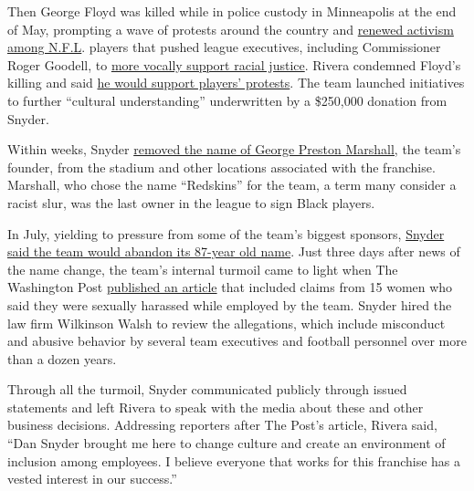 Then George Floyd was killed while in police custody in Minneapolis at
the end of May, prompting a wave of protests around the country and
\href{https://www.nytimes3xbfgragh.onion/2020/06/12/sports/football/nfl-protest-colin-kaepernick-activism.html}{renewed
activism among N.F.L}. players that pushed league executives, including
Commissioner Roger Goodell, to
\href{https://www.nytimes3xbfgragh.onion/2020/06/05/sports/football/trump-anthem-kneeling-kaepernick.html}{more
vocally support racial justice}. Rivera condemned Floyd's killing and
said
\href{https://www.washingtonfootball.com/video/head-coach-ron-rivera-i-m-proud-of-everyone-who-is-on-the-right-side-of-the-figh}{he
would support players' protests}. The team launched initiatives to
further ``cultural understanding'' underwritten by a \$250,000 donation
from Snyder.

Within weeks, Snyder
\href{https://www.nytimes3xbfgragh.onion/2020/06/24/sports/football/redskins-ring-of-fame-marshall.html}{removed
the name of George Preston Marshall,} the team's founder, from the
stadium and other locations associated with the franchise. Marshall, who
chose the name ``Redskins'' for the team, a term many consider a racist
slur, was the last owner in the league to sign Black players.

In July, yielding to pressure from some of the team's biggest sponsors,
\href{https://www.nytimes3xbfgragh.onion/2020/07/13/sports/football/washington-redskins-new-name.html}{Snyder
said the team would abandon its 87-year old name}. Just three days after
news of the name change, the team's internal turmoil came to light when
The Washington Post
\href{https://www.washingtonpost.com/sports/2020/07/16/redskins-sexual-harassment-larry-michael-alex-santos/?arc404=true}{published
an article} that included claims from 15 women who said they were
sexually harassed while employed by the team. Snyder hired the law firm
Wilkinson Walsh to review the allegations, which include misconduct and
abusive behavior by several team executives and football personnel over
more than a dozen years.

Through all the turmoil, Snyder communicated publicly through issued
statements and left Rivera to speak with the media about these and other
business decisions. Addressing reporters after The Post's article,
Rivera said, ``Dan Snyder brought me here to change culture and create
an environment of inclusion among employees. I believe everyone that
works for this franchise has a vested interest in our success.''

